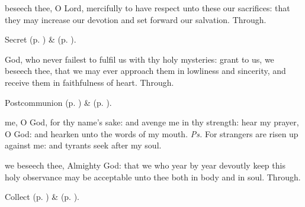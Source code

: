 \secret
{} beseech thee, O Lord, mercifully to have respect unto these our sacrifices: that they may increase our devotion and set forward our salvation. Through.
\begin{rubric}
     Secret  (p. \pageref{AshWednesdayMassSecret}) \&   (p. \pageref{SPLivingDeparted}).
\end{rubric}
\postcommunion
{} God, who never failest to fulfil us with thy holy mysteries: grant to us, we beseech thee, that we may ever approach them in lowliness and sincerity, and receive them in faithfulness of heart. Through.
\begin{rubric}
     Postcommunion  (p. \pageref{AshWednesdayMassPostcommunion}) \&   (p. \pageref{SPLivingDeparted}).
\end{rubric}


\introit
{} me, O God, for thy name's sake: and avenge me in thy strength: hear my prayer, O God: and hearken unto the words of my mouth. \textit{Ps.} For strangers are risen up against me: and tyrants seek after my soul.

\collect
{} we beseech thee, Almighty God: that we who year by year devoutly keep this holy observance may be acceptable unto thee both in body and in soul. Through.
\begin{rubric}
     Collect  (p. \pageref{AshWednesdayMassCollect}) \&   (p. \pageref{SPLivingDeparted}).
\end{rubric}


